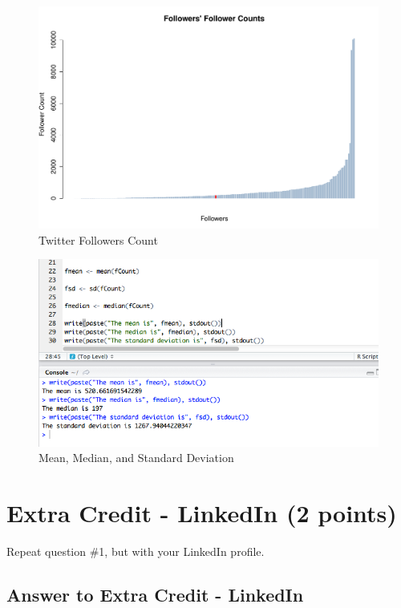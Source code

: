 \documentclass{article}
\begin{document}
\begin{figure}[H]
\centering
\includegraphics[scale=0.40]{q2/FollowerCountGraph}
\caption{Twitter Followers Count}
\label{followercounts}
\end{figure}

\begin{figure}[H]
\centering
\includegraphics[scale=0.50]{q2/statsoutput}
\caption{Mean, Median, and Standard Deviation}
\label{statsoutputfollowers}
\end{figure}

\clearpage

\section*{Extra Credit - LinkedIn (2 points)}

Repeat question \#1, but with your LinkedIn profile.

\subsection*{Answer to Extra Credit - LinkedIn}
\end{document}
